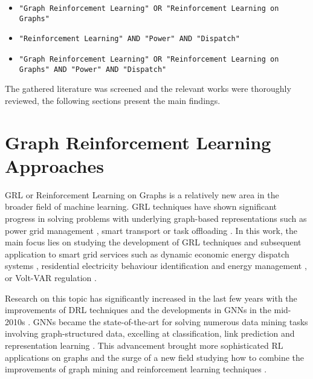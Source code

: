 \begin{itemize}
	\item \texttt{"Graph Reinforcement Learning" OR "Reinforcement Learning on Graphs"}
	\item \texttt{"Reinforcement Learning" AND "Power" AND "Dispatch"}
	\item \texttt{"Graph Reinforcement Learning" OR "Reinforcement Learning on Graphs" AND "Power" AND "Dispatch"}
\end{itemize}

 The gathered literature was screened and the relevant works were thoroughly reviewed, the following sections present the main findings.


\begin{comment}
	* Add literature histogram chart
\end{comment}



\section{Graph Reinforcement Learning Approaches} \label{sec:review-grl}

\ac{GRL} or Reinforcement Learning on Graphs is a relatively new area in the broader field of machine learning. \ac{GRL} techniques have shown significant progress in solving problems with underlying graph-based representations such as power grid management \cite{liNovelGraphReinforcement2022, chenGraphRepresentationLearningbased2023}, smart transport \cite{xingBilevelGraphReinforcement2023, almasanDeepReinforcementLearning2022} or task offloading \cite{gaoFastAdaptiveTask2023, liGraphReinforcementLearningbased2022}. In this work, the main focus lies on studying the development of \ac{GRL} techniques and subsequent application to smart grid services such as dynamic economic energy dispatch systems \cite{chenScalableGraphReinforcement2023, xingRealtimeOptimalScheduling2023}, residential electricity behaviour identification and energy management \cite{chenGraphRepresentationLearningbased2023}, or Volt-VAR regulation \cite{huMultiagentGraphReinforcement2024}.  \par
Research on this topic has significantly increased in the last few years with the improvements of \ac{DRL} techniques and the developments in \acp{GNN} in the mid-2010s \cite{kipfSemiSupervisedClassificationGraph2017, velickovicGraphAttentionNetworks2018, liGatedGraphSequence2016, gaoGraphUNets2019}. \acp{GNN} became the state-of-the-art for solving numerous data mining tasks involving graph-structured data, excelling at classification, link prediction and representation learning \cite{xuHowPowerfulAre2019, nieReinforcementLearningGraphs2023}. This advancement brought more sophisticated \ac{RL} applications on graphs and the surge of a new field studying how to combine the improvements of graph mining and reinforcement learning techniques \cite{vesselinovaLearningCombinatorialOptimization2020, nieReinforcementLearningGraphs2023}. \par

